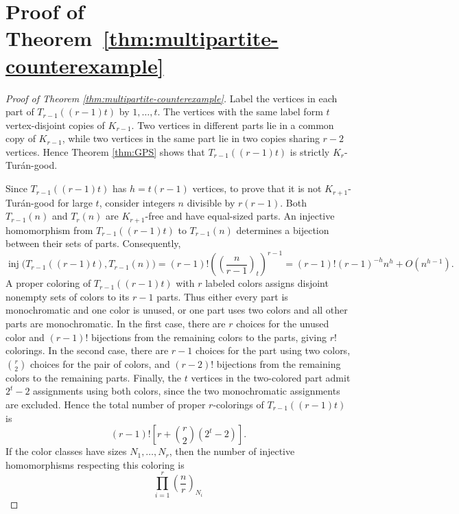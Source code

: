 \documentclass[11pt]{article}
\numberwithin{equation}{section}
\theoremstyle{definition}
\theoremstyle{remark}
\newcommand{\inj}{\operatorname{inj}}
\begin{document}
\section{Proof of Theorem~\ref{thm:multipartite-counterexample}}
\label{sec:multipartite-proof}

\begin{proof}[Proof of Theorem \ref{thm:multipartite-counterexample}]
Label the vertices in each part of $T_{r-1}((r-1)t)$ by $1,\dots,t$.
The vertices with the same label form $t$
vertex-disjoint copies of $K_{r-1}$. Two vertices in different parts lie
in a common copy of $K_{r-1}$, while two vertices in the same part lie in
two copies sharing $r-2$ vertices. Hence Theorem \ref{thm:GPS} shows
that $T_{r-1}((r-1)t)$ is strictly $K_r$-Tur\'an-good.

Since $T_{r-1}((r-1)t)$ has $h=t(r-1)$ vertices, to prove that it is not
$K_{r+1}$-Tur\'an-good for large $t$, consider integers $n$ divisible by
$r(r-1)$. Both $T_{r-1}(n)$ and $T_r(n)$ are $K_{r+1}$-free and
have equal-sized parts. An injective homomorphism from
$T_{r-1}((r-1)t)$ to $T_{r-1}(n)$ determines a bijection between their
sets of parts.
Consequently,
\begin{equation}
\label{eq:counter-T-rminus1}
  \inj\bigl(T_{r-1}((r-1)t),T_{r-1}(n)\bigr)
  =(r-1)!\left(\left(\frac{n}{r-1}\right)_t\right)^{r-1}
  =(r-1)!(r-1)^{-h}n^h+O(n^{h-1}).
\end{equation}
A proper coloring of $T_{r-1}((r-1)t)$ with $r$ labeled colors assigns
disjoint nonempty sets of colors to its $r-1$ parts. Thus either every
part is monochromatic and one color is unused, or one part uses two
colors and all other parts are monochromatic. In the first case, there
are $r$ choices for the unused color and $(r-1)!$ bijections from the
remaining colors to the parts, giving $r!$ colorings. In the second
case, there are $r-1$ choices for the part using two colors,
$\binom r2$ choices for the pair of colors, and $(r-2)!$ bijections from
the remaining colors to the remaining parts. Finally, the $t$ vertices
in the two-colored part admit $2^t-2$ assignments using both colors,
since the two monochromatic assignments are excluded. Hence the total
number of proper $r$-colorings of $T_{r-1}((r-1)t)$ is
\begin{equation*}
  (r-1)!\left[r+\binom r2(2^t-2)\right].
\end{equation*}
If the color classes have sizes $N_1,\dots,N_r$, then the number of injective
homomorphisms respecting this coloring is
\[
  \prod_{i=1}^r\left(\frac nr\right)_{N_i}
\]
\end{proof}
\end{document}
